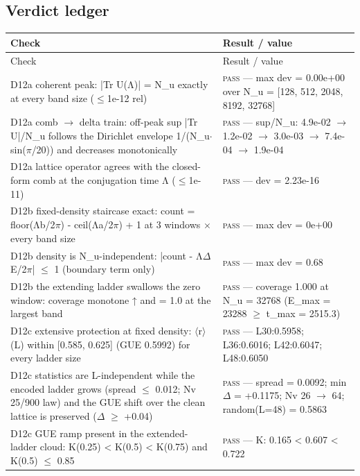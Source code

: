 \documentclass[11pt,a4paper]{article}
\begin{document}
\subsection{Verdict ledger}
\begin{longtable}{@{}p{}p{}@{}}
\toprule
Check & Result / value \\
\midrule
\endfirsthead
\toprule
Check & Result / value \\
\midrule
\endhead
\bottomrule
\endfoot
D12a coherent peak: |Tr U(Λ)| = N\_u exactly at every band size ($\le$1e-12 rel) & \textsc{pass} --- max dev = 0.00e+00 over N\_u = [128, 512, 2048, 8192, 32768] \\
D12a comb $\to$ delta train: off-peak sup |Tr U|/N\_u follows the Dirichlet envelope 1/(N\_u$\cdot$sin($\pi$/20)) and decreases monotonically & \textsc{pass} --- sup/N\_u: 4.9e-02 $\to$ 1.2e-02 $\to$ 3.0e-03 $\to$ 7.4e-04 $\to$ 1.9e-04 \\
D12a lattice operator agrees with the closed-form comb at the conjugation time Λ ($\le$1e-11) & \textsc{pass} --- dev = 2.23e-16 \\
D12b fixed-density staircase exact: count = floor(Λb/2$\pi$) - ceil(Λa/2$\pi$) + 1 at 3 windows $\times$ every band size & \textsc{pass} --- max dev = 0e+00 \\
D12b density is N\_u-independent: |count - Λ$\Delta$E/2$\pi$| $\le$ 1 (boundary term only) & \textsc{pass} --- max dev = 0.68 \\
D12b the extending ladder swallows the zero window: coverage monotone ↑ and = 1.0 at the largest band & \textsc{pass} --- coverage 1.000 at N\_u = 32768 (E\_max = 23288 $\ge$ t\_max = 2515.3) \\
D12c extensive protection at fixed density: $\langle$r$\rangle$(L) within [0.585, 0.625] (GUE 0.5992) for every ladder size & \textsc{pass} --- L30:0.5958; L36:0.6016; L42:0.6047; L48:0.6050 \\
D12c statistics are L-independent while the encoded ladder grows (spread $\le$ 0.012; Nv 25/900 law) and the GUE shift over the clean lattice is preserved ($\Delta$ $\ge$ +0.04) & \textsc{pass} --- spread = 0.0092; min $\Delta$ = +0.1175; Nv 26 $\to$ 64; random(L=48) = 0.5863 \\
D12c GUE ramp present in the extended-ladder cloud: K(0.25) < K(0.5) < K(0.75) and K(0.5) $\le$ 0.85 & \textsc{pass} --- K: 0.165 < 0.607 < 0.722 \\
\end{longtable}
\end{document}
